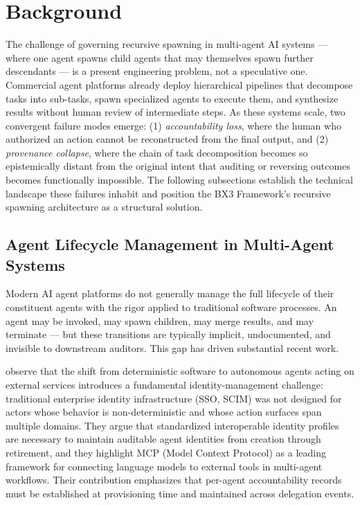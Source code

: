 \section{Background}
\label{sec:background}

The challenge of governing recursive spawning in multi-agent AI systems --- where one agent spawns child agents that may themselves spawn further descendants --- is a present engineering problem, not a speculative one. Commercial agent platforms already deploy hierarchical pipelines that decompose tasks into sub-tasks, spawn specialized agents to execute them, and synthesize results without human review of intermediate steps. As these systems scale, two convergent failure modes emerge: (1) \emph{accountability loss}, where the human who authorized an action cannot be reconstructed from the final output, and (2) \emph{provenance collapse}, where the chain of task decomposition becomes so epistemically distant from the original intent that auditing or reversing outcomes becomes functionally impossible. The following subsections establish the technical landscape these failures inhabit and position the BX3 Framework's recursive spawning architecture as a structural solution.

\subsection{Agent Lifecycle Management in Multi-Agent Systems}

Modern AI agent platforms do not generally manage the full lifecycle of their constituent agents with the rigor applied to traditional software processes. An agent may be invoked, may spawn children, may merge results, and may terminate --- but these transitions are typically implicit, undocumented, and invisible to downstream auditors. This gap has driven substantial recent work.

 observe that the shift from deterministic software to autonomous agents acting on external services introduces a fundamental identity-management challenge: traditional enterprise identity infrastructure (SSO, SCIM) was not designed for actors whose behavior is non-deterministic and whose action surfaces span multiple domains. They argue that standardized interoperable identity profiles are necessary to maintain auditable agent identities from creation through retirement, and they highlight MCP (Model Context Protocol) as a leading framework for connecting language models to external tools in multi-agent workflows. Their contribution emphasizes that per-agent accountability records must be established at provisioning time and maintained across delegation events.


